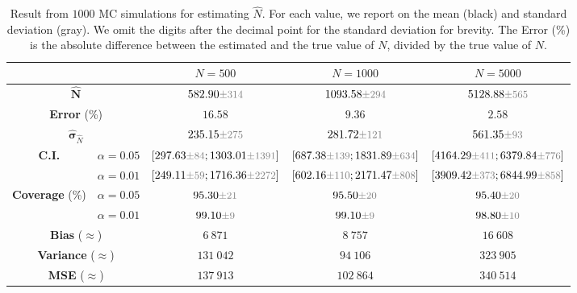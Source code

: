 \begin{table}[h]
    \centering 
    \caption*{$p_i \sim 0.01 \cdot \mathrm{Beta}(2, 2)$}
    \begin{tabular}{c c|c c c}
        \toprule
        & & \multicolumn{1}{|c|}{${N}=500$} & \multicolumn{1}{c|}{${N}=1000$} & \multicolumn{1}{c}{${N}=5000$} \\
        \midrule
        \multicolumn{2}{c|}{${\hat{\mathbf{N}}}$} & $582.90 \variance{314}$ & $1093.58 \variance{294}$ & $5128.88 \variance{565}$  \\
        \multicolumn{2}{c|}{\textbf{Error} (\%)} & $16.58$ & $9.36$ & $2.58$ \\
        \multicolumn{2}{c|}{${\hat{\mathbf{\sigma}}}_{\hat{N}}$} & $235.15 \variance{275}$ & $281.72 \variance{121}$ & $561.35 \variance{93}$\\
        \multirow{2}{*}{\textbf{C.I.}} & $\alpha = 0.05$ & $[297.63 \variance{84}; 1303.01 \variance{1391}]$ & $[687.38 \variance{139}; 1831.89 \variance{634}]$ & $[4164.29 \variance{411}; 6379.84 \variance{776}]$
        \\
        & $\alpha = 0.01$ & $[249.11 \variance{59}; 1716.36 \variance{2272}]$ & $[602.16 \variance{110}; 2171.47 \variance{808}]$ & $[3909.42 \variance{373}; 6844.99 \variance{858}]$ \\
        \midrule
        \multirow{2}{*}{\textbf{Coverage} (\%)} & $\alpha = 0.05$ & $95.30 \variance{21}$ & $95.50 \variance{20}$ & $95.40 \variance{20}$ \\
        & $\alpha = 0.01$ & $99.10 \variance{9}$ & $99.10 \variance{9}$ & $98.80 \variance{10}$ \\
        \multicolumn{2}{c|}{\textbf{Bias} ($\approx$)} & $6\ 871$ & $8\ 757$ & $16\ 608$ \\
        \multicolumn{2}{c|}{\textbf{Variance} ($\approx$)} & $131\ 042$ & $94\ 106$ & $323\ 905$ \\
        \multicolumn{2}{c|}{\textbf{MSE} ($\approx$)} & $137\ 913$ & $102\ 864$ & $340\ 514$ \\
        \bottomrule
    \end{tabular}
    \caption{Result from $1000$ MC simulations for estimating $\hat{N}$. For each value, we report on the mean (black) and standard deviation (gray). We omit the digits after the decimal point for the standard deviation for brevity.
    The Error (\%) is the absolute difference between the estimated and the true value of $N$, divided by the true value of $N$.}
    \label{tab:problem_2_results_beta_2_2}
\end{table}

